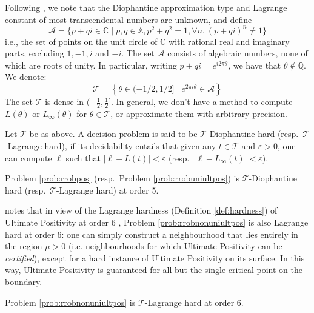 Following \cite{joeljames3}, we note that the Diophantine approximation type and Lagrange constant of most transcendental numbers are unknown, and define
\begin{equation}
\mathcal A=\{p+q i \in \mathbb{C} \mid p,q \in \mathbb{A}, p^2+q^2=1, \forall n.~(p + qi)^n \ne 1\}
\end{equation}
i.e., the set of points on the unit circle of $\mathbb{C}$ with rational real and imaginary parts, excluding $1,-1, i$ and $-i$. The set $\mathcal A$ consists of algebraic numbers, none of which are roots of unity. In particular, writing $p+q i= e^{i 2 \pi \theta}$, we have that $\theta \notin \mathbb{Q}$. We denote:
\begin{equation}
\label{eq:keyset}
\mathcal{T} = \left\{ \theta \in (- 1/2, 1/2] \mid e^{2 \pi i \theta} \in \mathcal{A}\right\}
\end{equation}
The set $\mathcal{T}$ is dense in $(- \frac 1 2, \frac 1 2]$. In general, we don't have a method to compute $L(\theta)$ or $L_\infty(\theta)$ for $\theta \in \mathcal{T}$, or approximate them with arbitrary precision.

\begin{definition}
\label{def:hardness}
Let $\mathcal{T}$ be as above. A decision problem is said to be $\mathcal{T}$-Diophantine hard (resp.\ $\mathcal{T}$-Lagrange hard), if its decidability entails that given any $t \in \mathcal{T}$ and $\varepsilon > 0$, one can compute $\ell$ such that $|\ell - L(t)| < \varepsilon$ (resp.\  $|\ell - L_\infty(t)| < \varepsilon$).
\end{definition}

\begin{theorem}
\label{thm:hardness}
Problem \ref{prob:rrobpos} (resp.\ Problem \ref{prob:rrobuniultpos}) is $\mathcal{T}$-Diophantine hard (resp.\ $\mathcal{T}$-Lagrange hard) at order 5. 
\end{theorem}

\cite{originalarxiv} notes that in view of the Lagrange hardness (Definition \ref{def:hardness}) of Ultimate Positivity at order 6 \cite{joeljames3}, Problem \ref{prob:rrobnonuniultpos} is also Lagrange hard at order 6: one can simply construct a neighbourhood that lies entirely in the region $\mu > 0$ (i.e. neighbourhoods for which Ultimate Positivity can be \textit{certified}), except for a hard instance of Ultimate Positivity on its surface. In this way, Ultimate Positivity is guaranteed for all but the single critical point on the boundary.

\begin{theorem}
\label{thm:hardness2}
Problem \ref{prob:rrobnonuniultpos} is $\mathcal{T}$-Lagrange hard at order 6. 
\end{theorem}
